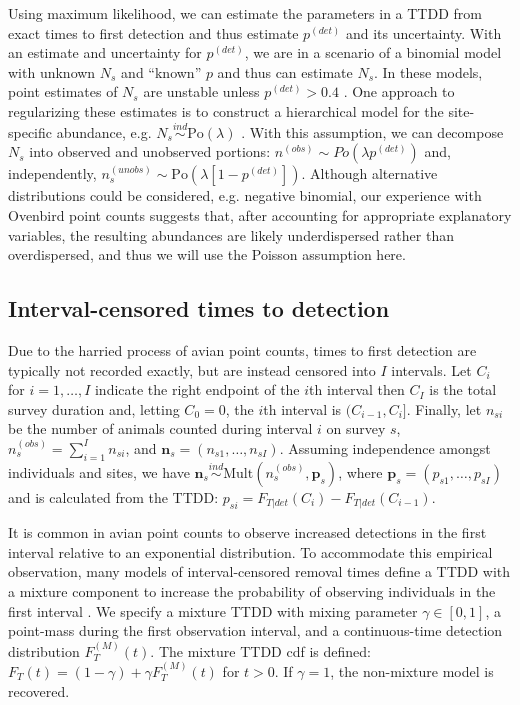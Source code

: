 \documentclass[useAMS,usenatbib,referee,12pt]{article}
\newcommand{\vn}{\textbf{n}}
\newcommand{\vp}{\textbf{p}}
\newcommand{\Po}{\mbox{Po}}
\newcommand{\Mult}{\mbox{Mult}}
\newcommand{\pdet}{p^{(det)}}
\newcommand{\ind}{\stackrel{ind}{\sim}}
\newcommand{\Fm}{F_T^{(M)}}
\begin{document}
Using maximum likelihood, we can estimate the parameters in a TTDD from exact times to first detection and thus estimate $\pdet$ and its uncertainty.
With an estimate and uncertainty for $\pdet$, we are in a scenario of a binomial model with unknown $N_s$ and ``known'' $p$ and thus can estimate $N_s$.
In these models, point estimates of $N_s$ are unstable unless $\pdet>0.4$ \citep{Olkin1981}.
One approach to regularizing these estimates is to construct a hierarchical model for the site-specific abundance, e.g. $N_s\ind \Po(\lambda)$ \citep{Raftery1988, Royle2004NMixture}. 
With this assumption, we can decompose $N_{s}$ into observed and unobserved portions: $n^{(obs)} \sim Po(\lambda \pdet)$ and, independently, $n_{s}^{(unobs)} \sim \Po\left(\lambda[1-\pdet]\right)$.
Although alternative distributions could be considered, e.g. negative binomial, our experience with Ovenbird point counts suggests that, after accounting for appropriate explanatory variables, the resulting abundances are likely underdispersed rather than overdispersed, and thus we will use the Poisson assumption here. 


\subsection{Interval-censored times to detection}

Due to the harried process of avian point counts, times to first detection are typically not recorded exactly, but are instead censored into $I$ intervals. 
Let $C_i$ for $i=1,\dots,I$ indicate the right endpoint of the $i$th interval then $C_I$ is the total survey duration and, letting $C_0=0$, the $i$th interval is $(C_{i-1},C_{i}]$. 
Finally, let $n_{si}$ be the number of animals counted during interval $i$ on survey $s$, $n_{s}^{(obs)} = \sum_{i=1}^I n_{si}$, and $\vn_{s}=(n_{s1},\dots,n_{sI})$.
Assuming independence amongst individuals and sites, we have $\vn_{s} \ind \Mult \left(n_{s}^{(obs)}, \vp_{s}\right)$, where $\vp_{s}=(p_{s1},\dots,p_{sI})$ and is calculated from the TTDD: $p_{si} = F_{T|det}(C_i) - F_{T|det}(C_{i-1})$.  

It is common in avian point counts to observe increased detections in the first interval relative to an exponential distribution.
To accommodate this empirical observation, many models of interval-censored removal times define a TTDD with a mixture component to increase the probability of observing individuals in the first interval \citep{Farnsworth2002, Royle2004Generalized, Farnsworth2005, Etterson2009, Reidy2011}.
We specify a mixture TTDD with mixing parameter $\gamma\in[0,1]$, a point-mass during the first observation interval, and a continuous-time detection distribution $\Fm(t)$.  
The mixture TTDD cdf is defined: $F_T(t) = (1-\gamma) + \gamma \Fm(t)$ for $t>0$.
If $\gamma=1$, the non-mixture model is recovered.
\end{document}
